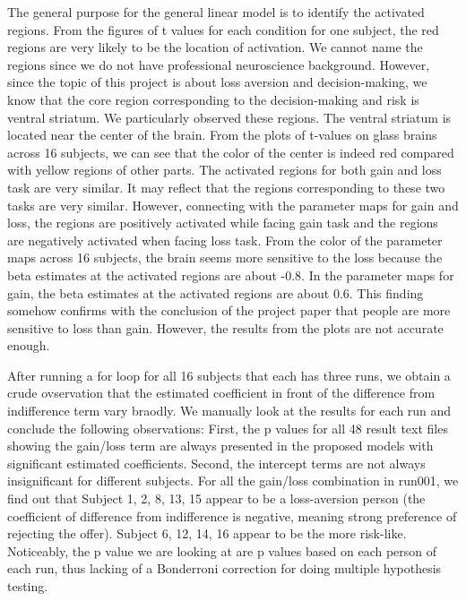 \par \indent The general purpose for the general linear model is to identify 
the activated regions. From the figures of t values for each condition for one 
subject, the red regions are very likely to be the location of activation. 
We cannot name the regions since we do not have professional neuroscience 
background. However, since the topic of this project is about loss aversion 
and decision-making, we know that the core region corresponding to the 
decision-making and risk is ventral striatum. We particularly observed these 
regions. The ventral striatum is located near the center of the brain. From 
the plots of t-values on glass brains across 16 subjects, we can see that the 
color of the center is indeed red compared with yellow regions of other parts. 
The activated regions for both gain and loss task are very similar. It may 
reflect that the regions corresponding to these two tasks are very similar. 
However, connecting with the parameter maps for gain and loss, the regions are 
positively activated while facing gain task and the regions are negatively 
activated when facing loss task. From the color of the parameter maps across 16 
subjects, the brain seems more sensitive to the loss because the beta estimates 
at the activated regions are about -0.8. In the parameter maps for gain, the 
beta estimates at the activated regions are about 0.6. This finding somehow 
confirms with the conclusion of the project paper that people are more 
sensitive to loss than gain. However, the results from the plots are not 
accurate enough.


\par \indent After running a for loop for all 16 subjects that each has three
runs, we obtain a crude ovservation that the estimated coefficient in front of
the difference from indifference term vary braodly. We manually look at the 
results for each run and conclude the following observations: 
First, the p values for all 48 result text files showing the gain/loss term
are always presented in the proposed models with significant estimated 
coefficients. Second, the intercept terms are not always insignificant for 
different subjects. For all the gain/loss combination in run001, we find out 
that Subject 1, 2, 8, 13, 15 appear to be a loss-aversion person (the 
coefficient of difference from indifference is negative, meaning strong 
preference of rejecting the offer). Subject 6, 12, 14, 16 appear to be the 
more risk-like. 
Noticeably, the p value we are looking at are p values based on each person of
each run, thus lacking of a Bonderroni correction for doing multiple hypothesis 
testing.  

